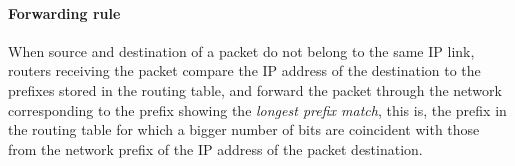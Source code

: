 \paragraph{Forwarding rule}

When source and destination of a packet do not belong to the same IP link, routers receiving the packet compare the IP address of the destination to the prefixes stored in the routing table, and forward the packet through the network  corresponding to the prefix showing the {\em longest prefix match}, this is, the prefix in the routing table for which a bigger number of bits are coincident with those from the network prefix of the IP address of the packet destination. %




